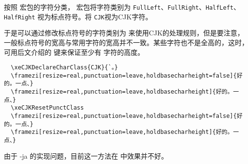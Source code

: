 \documentclass{ctxdoc}
\begin{document}
\begin{texnote}
  按照  宏包的字符分类， 宏包将字符类别为 \verb|FullLeft|、\verb|FullRight|、\verb|HalfLeft|、\verb|HalfRight| 视为标点符号。将 \verb|CJK|视为CJK字符。

于是可以通过修改标点符号的字符类别为  来使用CJK的处理规则，但是要注意，一般标点符号的宽高与常用字符的宽高并不一致。某些字符也不是全高的，这时，可用后文介绍的  键来保证至少有  字符的高度。
\begin{verbatim}
  \xeCJKDeclareCharClass{CJK}{`。}
  \framezi[resize=real,punctuation=leave,holdbasecharheight=false]{好的。一点、}
  \framezi[resize=real,punctuation=leave,holdbasecharheight]{好的。一点、}
  \xeCJKResetPunctClass
  \framezi[resize=real,punctuation=leave,holdbasecharheight=false]{好的。一点、}
  \framezi[resize=real,punctuation=leave,holdbasecharheight]{好的。一点、}
\end{verbatim}

\xeCJKResetPunctClass


由于 \LuaTeX-ja 的实现问题，目前这一方法在 \LuaTeX{} 中效果并不好。
\end{texnote}
\end{document}
